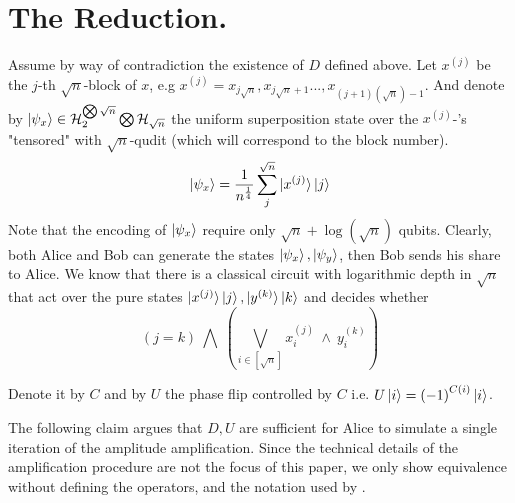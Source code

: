 \documentclass{article}
\begin{document}
\section{The Reduction.} 
Assume by way of contradiction the existence of $D$ defined above.  
Let \( x^{(j)} \) be the \(j\)-th \(\sqrt{n}\)-block of \(x\), e.g \(x^{(j)} = x_{j\sqrt{n}},x_{j\sqrt{n}+1}...,x_{(j+1)(\sqrt{n})-1}  \). And denote by \( \ket{\psi_x} \in \mathcal{H}_{2}^{\bigotimes \sqrt{n}} \bigotimes \mathcal{H}_{\sqrt{n}} \) the uniform superposition state over the \( x^{(j)}\)-'s "tensored" with \(\sqrt{n}\)-qudit (which will correspond to the block number). 
\[ \ket{\psi_x} = \frac{1}{n^\frac{1}{4}}\sum_{j}^{\sqrt{n}}\ket{x^{(j)}}\ket{j} \] Note that the encoding of \( \ket{\psi_x} \) require only \( \sqrt{n} + \log(\sqrt{n}) \) qubits.
Clearly, both Alice and Bob can generate the states \( \ket{\psi_x}, \ket{\psi_y} \), then Bob sends his share to Alice.
We know that there is a classical circuit with logarithmic depth in \( \sqrt{n} \) that act over the pure states \( \ket{x^{(j)}}\ket{j}, \ket{y^{(k)}}\ket{k} \) and decides whether \[ \left( j =  k \right) \ \bigwedge  \ \left( \bigvee_{i \in [ \sqrt{n} ] } x^{(j)}_{i} \ \wedge \  y^{(k)}_{i} \right)   \]


Denote it by \( C \) and by \( U \) the phase flip controlled by $C$ i.e. $U\ket{i}=\left( -1 \right)^{C\left( i \right)}\ket{i}$. 

The following claim argues that $D, U$ are sufficient for Alice to simulate a single iteration of the amplitude amplification. Since the technical details of the amplification procedure are not the focus of this paper, we only show equivalence without defining the operators, and the notation used by \cite{Brassard_2002}.   
\end{document}
